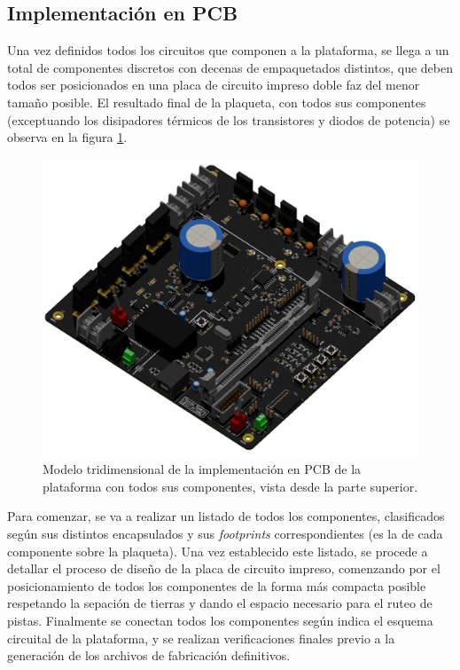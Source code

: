 \subsection{Implementación en PCB}

Una vez definidos todos los circuitos que componen a la plataforma, se llega a un total de { componentes} discretos con decenas de empaquetados distintos, que deben todos ser posicionados en una placa de circuito impreso doble faz del menor tamaño posible. El resultado final de la plaqueta, con todos sus componentes (exceptuando los disipadores térmicos de los transistores y diodos de potencia) se observa en la figura \ref{fig:PCB_3D}.\\

\begin{figure}[h]
    \centering
    \includegraphics[scale=0.34]{Imagenes/PCB 3D Raytracing.png}
    \caption{Modelo tridimensional de la implementación en PCB de la plataforma con todos sus componentes, vista desde la parte superior.}
    \label{fig:PCB_3D}
\end{figure}

Para comenzar, se va a realizar un listado de todos los componentes, clasificados según sus distintos encapsulados y sus \textit{footprints} correspondientes (es la  de cada componente sobre la plaqueta). Una vez establecido este listado, se procede a detallar el proceso de diseño de la placa de circuito impreso, comenzando por el posicionamiento de todos los componentes de la forma más compacta posible respetando la sepación de tierras y dando el espacio necesario para el ruteo de pistas. Finalmente se conectan todos los componentes según indica el esquema circuital de la plataforma, y se realizan verificaciones finales previo a la generación de los archivos de fabricación definitivos.\\


